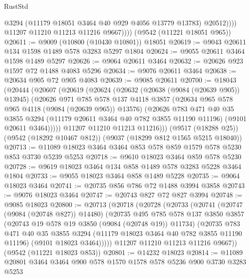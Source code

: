 \begin{lexlean}{RustStd}
\begin{coremodule}
                    @3294
                    (@11179 @18051 @3464 @40 @929 @4056 @13779 @13783)
                    @20512))))
            @11207
            @11210
            @11213
            @11216
            @9667))))
    (@9542 (@11221 @18051 @965))
@20611 := @9009 (@10800 (@10430 @10801)) @18051
@20619 := @9043 @20611 @134 @1598 @1489 @578 @3283 @5297 @1804
@20624 := @9055 @20611 @3464 @1598 @1489 @5297
@20626 := @9064 @20611 @3464
@20632 := @20626 @923 @1597 @72 @1488 @4083 @5296
@20634 := @9076 @20611 @3464
@20638 := @20634 @905 @72 @905 @4083
@20639 := @9085 @20611
@20700 := @18043
    (@20444
      (@20607
        (@20619
          (@20624
            (@20632
              (@20638 (@9084 (@20639 @905)) @13945)
              (@20626
                @971
                @785
                @578
                @137
                @4118
                @3857
                (@20634 @965 @578 @965 @4118 (@9084 (@20639 @965)) @13576)
                (@20626
                  @783
                  @471
                  @40
                  @35
                  @3855
                  @3294
                  (@11179 @20611 @3464 @40 @782 @3855 @11190 @11196)
                  (@9101 @20611 @3464)))))
          @11207
          @11210
          @11213
          @11216)))
    (@9517 (@18288 @25))
    (@9542 (@18292 @10467 @812))
    (@9037 (@18299 @812 @1565 @5215 @18040))
@20713 := @11089 @18023 @3464 @3464 @853 @578 @859 @1579 @578 @5230 @853 @3730 @5239 @5253
@20718 := @9610 @18023 @3464 @859 @578 @5230
@20728 := @9619 @18023 @3464 @134 @858 @1489 @578 @3283 @5228 @3464 @1804
@20733 := @9055 @18023 @3464 @858 @1489 @5228
@20735 := @9064 @18023 @3464
@20741 := @20735 @856 @786 @72 @1488 @3994 @3858
@20743 := @9076 @18023 @3464
@20747 := @20743 @827 @72 @827 @3994
@20748 := @9085 @18023
@20800 := @20713
    (@20718
      (@20728
        (@20733
          (@20741
            (@20747 (@9084 (@20748 @827)) @14480)
            (@20735
              @495
              @785
              @578
              @137
              @3850
              @3857
              (@20743 @19 @578 @19 @3850 (@9084 (@20748 @19)) @11734)
              (@20735
                @783
                @471
                @40
                @35
                @3855
                @3294
                (@11179 @18023 @3464 @40 @782 @3855 @11190 @11196)
                (@9101 @18023 @3464)))))
        @11207
        @11210
        @11213
        @11216
        @9667))
    (@9542 (@11221 @18023 @853))
@20801 := @14232 @18023
@20814 := @11089 @20801 @3464 @3464 @900 @578 @1570 @1578 @578 @5236 @900 @3730 @3283 @5253

\end{coremodule}
\end{lexlean}

